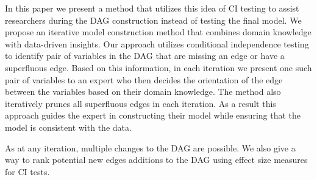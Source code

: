 \documentclass{uai2025} %
\begin{document}

In this paper we present a method that utilizes this idea of CI testing to
assist researchers during the DAG construction instead of testing the final
model. We propose an iterative model construction method that combines domain
knowledge with data-driven insights. Our approach utilizes conditional
independence testing to identify pair of variables in the DAG that are missing
an edge or have a superfluous edge. Based on this information, in each
iteration we present one such pair of variables to an expert who then decides
the orientation of the edge between the variables based on their domain
knowledge. The method also iteratively prunes all superfluous edges in each
iteration. As a result this approach guides the expert in constructing their
model while ensuring that the model is consistent with the data.

As at any iteration, multiple changes to the DAG are possible. We also give a
way to rank potential new edges additions to the DAG using effect size measures
for CI tests.
\end{document}
